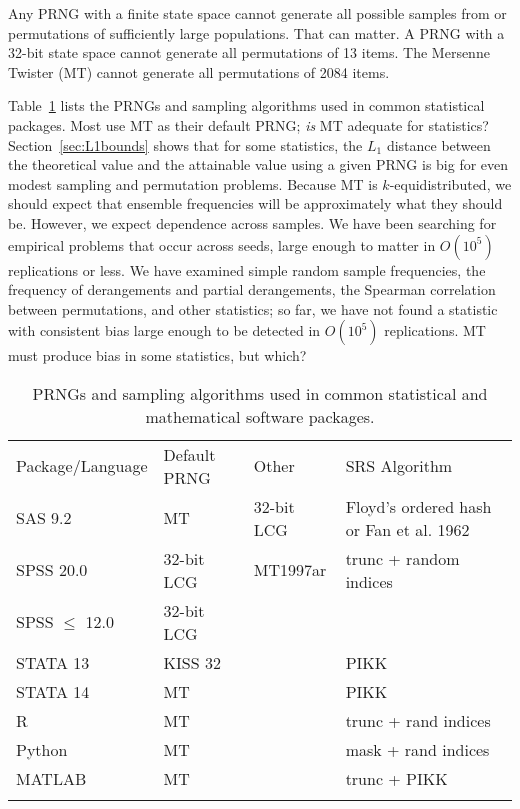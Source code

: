 \documentclass[graybox]{svmult}
\begin{document}
Any PRNG with a finite state space cannot generate all possible samples from or permutations of 
sufficiently large populations.
That can matter.
A PRNG with a 32-bit state space cannot generate all permutations of 13 items.
The Mersenne Twister (MT) cannot generate all permutations of 2084 items.

Table~\ref{tab:software} lists the PRNGs and sampling algorithms used in common statistical packages.
Most use MT as their default PRNG; \emph{is} MT adequate for statistics?
Section~\ref{sec:L1bounds} shows that for some statistics, the $L_1$ distance between the theoretical value and the attainable value using a given PRNG
 is big for even modest sampling and permutation problems.
Because MT is $k$-equidistributed, we should expect that ensemble frequencies will be approximately
what they should be.
However, we expect dependence across samples.
We have been searching for empirical problems that occur across seeds, large enough to matter in 
$O(10^5)$ replications or less.
We have examined simple random sample frequencies, the frequency of derangements and partial derangements, the Spearman correlation between permutations, 
and other statistics; so far, we have not found a statistic with consistent
bias large enough to be detected in $O(10^5)$ replications.
MT must produce bias in some statistics, but which?

\begin{table}
\caption{PRNGs and sampling algorithms used in common statistical and mathematical software packages.}
\label{tab:software}      
\begin{tabular}[h]{p{2.5cm}p{2.4cm}p{2.5cm}p{4cm}}
\hline\noalign{\smallskip}
Package/Language & Default PRNG & Other & SRS Algorithm  \\
\noalign{\smallskip}\svhline\noalign{\smallskip}
SAS 9.2              & MT         	& 32-bit LCG & Floyd's ordered hash or Fan et al. 1962 \\
SPSS 20.0          & 32-bit LCG  & MT1997ar  & trunc + random indices \\
SPSS $\le$ 12.0 & 32-bit LCG  &         &                \\
STATA 13            & KISS 32      &         & PIKK           \\
STATA 14            & MT              &         & PIKK           \\
R                         & MT              &         & trunc + rand indices \\
Python                 & MT             &         & mask + rand indices  \\
MATLAB              & MT             &         & trunc + PIKK         \\
\noalign{\smallskip}\hline\noalign{\smallskip}
\end{tabular}
\end{table}
\end{document}
